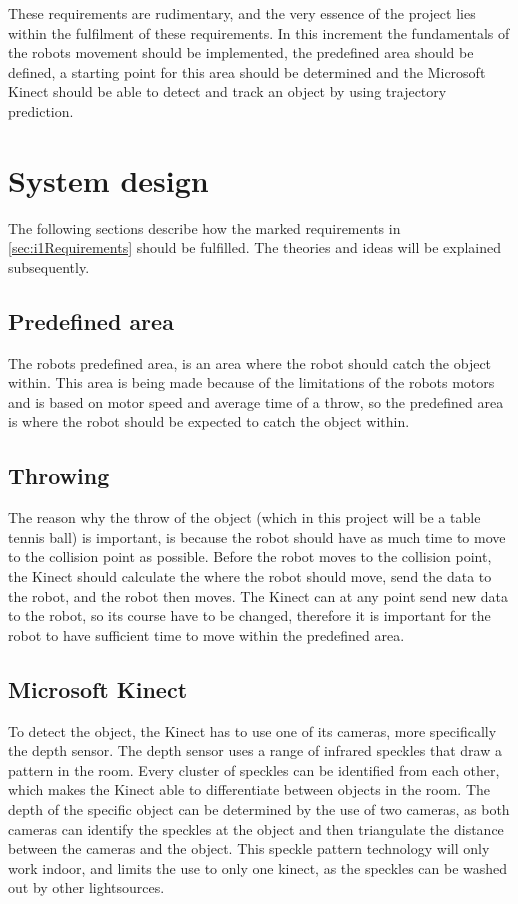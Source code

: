 These requirements are rudimentary, and the very essence of the project lies within the fulfilment of these requirements. In this increment the fundamentals of the robots movement should be implemented, the predefined area should be defined, a starting point for this area should be determined and the Microsoft Kinect should be able to detect and track an object by using trajectory prediction.

\section{System design}
\label{sec:i1System Design}
The following sections describe how the marked requirements in \ref{sec:i1Requirements} should be fulfilled. The theories and ideas will be explained subsequently.

\subsection{Predefined area}
\label{sec:i1Predefined area}
The robots predefined area, is an area where the robot should catch the object within. This area is being made because of the limitations of the robots motors and is based on motor speed and average time of a throw, so the predefined area is where the robot should be expected to catch the object within.

\subsection{Throwing}
\label{sec:i1Throwing}
The reason why the throw of the object (which in this project will be a table tennis ball) is important, is because the robot should have as much time to move to the collision point as possible. Before the robot moves to the collision point, the Kinect should calculate the where the robot should move, send the data to the robot, and the robot then moves. The Kinect can at any point send new data to the robot, so its course have to be changed, therefore it is important for the robot to have sufficient time to move within the predefined area.    

\subsection{Microsoft Kinect}
\label{sec:i1Microsoft Kinect}
To detect the object, the Kinect has to use one of its cameras, more specifically the depth sensor. The depth sensor uses a range of infrared speckles that draw a pattern in the room. Every cluster of speckles can be identified from each other, which makes the Kinect able to differentiate between objects in the room. The depth of the specific object can be determined by the use of two cameras, as both cameras can identify the speckles at the object and then triangulate the distance between the cameras and the object. This speckle pattern technology will only work indoor, and limits the use to only one kinect, as the speckles can be washed out by other lightsources.
\citep{kw}

